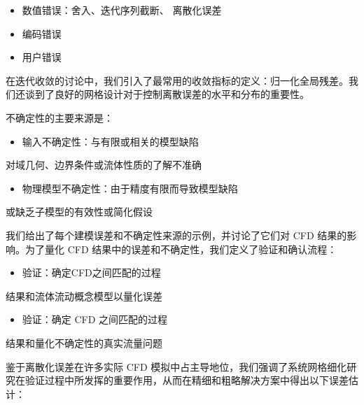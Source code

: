 \documentclass[11pt,a4paper,openany,fontset=none]{ctexbook}
\begin{document}
\begin{itemize}

\item 数值错误：舍入、迭代序列截断、 离散化误差

\item 编码错误

\item 用户错误

\end{itemize}

在迭代收敛的讨论中，我们引入了最常用的收敛指标的定义：归一化全局残差。我们还谈到了良好的网格设计对于控制离散误差的水平和分布的重要性。

不确定性的主要来源是：

\begin{itemize}

\item 输入不确定性：与有限或相关的模型缺陷

\end{itemize}

对域几何、边界条件或流体性质的了解不准确

\begin{itemize}

\item 物理模型不确定性：由于精度有限而导致模型缺陷

\end{itemize}

或缺乏子模型的有效性或简化假设

我们给出了每个建模误差和不确定性来源的示例，并讨论了它们对 CFD 结果的影响。为了量化 CFD 结果中的误差和不确定性，我们定义了验证和确认流程：

\begin{itemize}

\item 验证：确定CFD之间匹配的过程

\end{itemize}

结果和流体流动概念模型以量化误差

\begin{itemize}

\item 验证：确定 CFD 之间匹配的过程

\end{itemize}

结果和量化不确定性的真实流量问题

鉴于离散化误差在许多实际 CFD 模拟中占主导地位，我们强调了系统网格细化研究在验证过程中所发挥的重要作用，从而在精细和粗略解决方案中得出以下误差估计：
\end{document}

